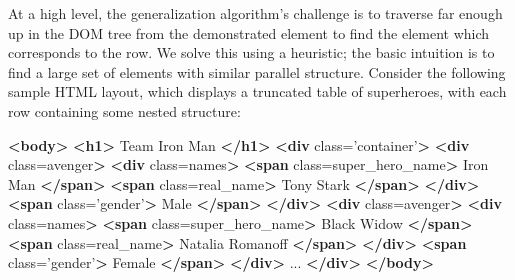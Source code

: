 \documentclass[sigconf,10pt]{acmart}
\newenvironment{Shaded}{}{}
\newcommand{\KeywordTok}[1]{\textcolor[rgb]{0.00,0.44,0.13}{\textbf{#1}}}
\newcommand{\NormalTok}[1]{#1}
\newcommand{\OtherTok}[1]{\textcolor[rgb]{0.00,0.44,0.13}{#1}}
\newcommand{\StringTok}[1]{\textcolor[rgb]{0.25,0.44,0.63}{#1}}
\begin{document}
At a high level, the generalization algorithm's challenge is to traverse
far enough up in the DOM tree from the demonstrated element to find the
element which corresponds to the row. We solve this using a heuristic;
the basic intuition is to find a large set of elements with similar
parallel structure. Consider the following sample HTML layout, which
displays a truncated table of superheroes, with each row containing some
nested structure:

\begin{Shaded}
\begin{Highlighting}[]
\KeywordTok{\textless{}body\textgreater{}}
    \KeywordTok{\textless{}h1\textgreater{}}\NormalTok{ Team Iron Man }\KeywordTok{\textless{}/h1\textgreater{}}
    \KeywordTok{\textless{}div}\OtherTok{ class=}\StringTok{’container’}\KeywordTok{\textgreater{}}
        \KeywordTok{\textless{}div}\OtherTok{ class=}\StringTok{\textquotesingle{}avenger\textquotesingle{}}\KeywordTok{\textgreater{}}
            \KeywordTok{\textless{}div}\OtherTok{ class=}\StringTok{\textquotesingle{}names\textquotesingle{}}\KeywordTok{\textgreater{}}
                \KeywordTok{\textless{}span}\OtherTok{ class=}\StringTok{\textquotesingle{}super\_hero\_name\textquotesingle{}}\KeywordTok{\textgreater{}}\NormalTok{ Iron Man }\KeywordTok{\textless{}/span\textgreater{}}
                \KeywordTok{\textless{}span}\OtherTok{ class=}\StringTok{\textquotesingle{}real\_name\textquotesingle{}}\KeywordTok{\textgreater{}}\NormalTok{ Tony Stark }\KeywordTok{\textless{}/span\textgreater{}}
            \KeywordTok{\textless{}/div\textgreater{}}
           \KeywordTok{\textless{}span}\OtherTok{ class=}\StringTok{’gender’}\KeywordTok{\textgreater{}}\NormalTok{ Male }\KeywordTok{\textless{}/span\textgreater{}}
        \KeywordTok{\textless{}/div\textgreater{}}
        \KeywordTok{\textless{}div}\OtherTok{ class=}\StringTok{\textquotesingle{}avenger\textquotesingle{}}\KeywordTok{\textgreater{}}
            \KeywordTok{\textless{}div}\OtherTok{ class=}\StringTok{\textquotesingle{}names\textquotesingle{}}\KeywordTok{\textgreater{}}
                \KeywordTok{\textless{}span}\OtherTok{ class=}\StringTok{\textquotesingle{}super\_hero\_name\textquotesingle{}}\KeywordTok{\textgreater{}}\NormalTok{  Black Widow }\KeywordTok{\textless{}/span\textgreater{}}
                \KeywordTok{\textless{}span}\OtherTok{ class=}\StringTok{\textquotesingle{}real\_name\textquotesingle{}}\KeywordTok{\textgreater{}}\NormalTok{ Natalia Romanoff }\KeywordTok{\textless{}/span\textgreater{}}
            \KeywordTok{\textless{}/div\textgreater{}}
            \KeywordTok{\textless{}span}\OtherTok{ class=}\StringTok{’gender’}\KeywordTok{\textgreater{}}\NormalTok{ Female }\KeywordTok{\textless{}/span\textgreater{}}
        \KeywordTok{\textless{}/div\textgreater{}}
\NormalTok{        ...}
    \KeywordTok{\textless{}/div\textgreater{}}
\KeywordTok{\textless{}/body\textgreater{}}
\end{Highlighting}
\end{Shaded}
\end{document}
